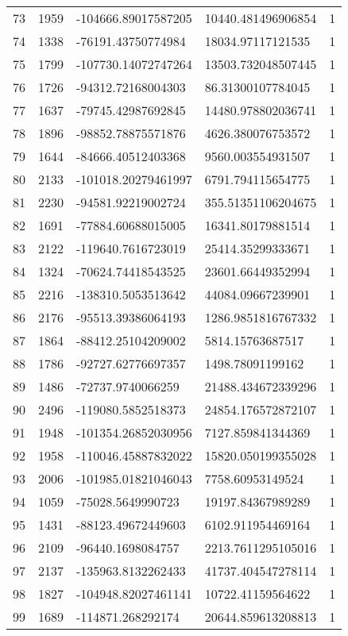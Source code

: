 \begin{longtable}{lllll}
    73 & 1959 & -104666.89017587205 & 10440.481496906854 & 1 \\
    74 & 1338 & -76191.43750774984 & 18034.97117121535 & 1 \\
    75 & 1799 & -107730.14072747264 & 13503.732048507445 & 1 \\
    76 & 1726 & -94312.72168004303 & 86.31300107784045 & 1 \\
    77 & 1637 & -79745.42987692845 & 14480.978802036741 & 1 \\
    78 & 1896 & -98852.78875571876 & 4626.380076753572 & 1 \\
    79 & 1644 & -84666.40512403368 & 9560.003554931507 & 1 \\
    80 & 2133 & -101018.20279461997 & 6791.794115654775 & 1 \\
    81 & 2230 & -94581.92219002724 & 355.51351106204675 & 1 \\
    82 & 1691 & -77884.60688015005 & 16341.80179881514 & 1 \\
    83 & 2122 & -119640.7616723019 & 25414.35299333671 & 1 \\
    84 & 1324 & -70624.74418543525 & 23601.66449352994 & 1 \\
    85 & 2216 & -138310.5053513642 & 44084.09667239901 & 1 \\
    86 & 2176 & -95513.39386064193 & 1286.9851816767332 & 1 \\
    87 & 1864 & -88412.25104209002 & 5814.15763687517 & 1 \\
    88 & 1786 & -92727.62776697357 & 1498.78091199162 & 1 \\
    89 & 1486 & -72737.9740066259 & 21488.434672339296 & 1 \\
    90 & 2496 & -119080.5852518373 & 24854.176572872107 & 1 \\
    91 & 1948 & -101354.26852030956 & 7127.859841344369 & 1 \\
    92 & 1958 & -110046.45887832022 & 15820.050199355028 & 1 \\
    93 & 2006 & -101985.01821046043 & 7758.60953149524 & 1 \\
    94 & 1059 & -75028.5649990723 & 19197.84367989289 & 1 \\
    95 & 1431 & -88123.49672449603 & 6102.911954469164 & 1 \\
    96 & 2109 & -96440.1698084757 & 2213.7611295105016 & 1 \\
    97 & 2137 & -135963.8132262433 & 41737.404547278114 & 1 \\
    98 & 1827 & -104948.82027461141 & 10722.41159564622 & 1 \\
    99 & 1689 & -114871.268292174 & 20644.859613208813 & 1
\end{longtable}